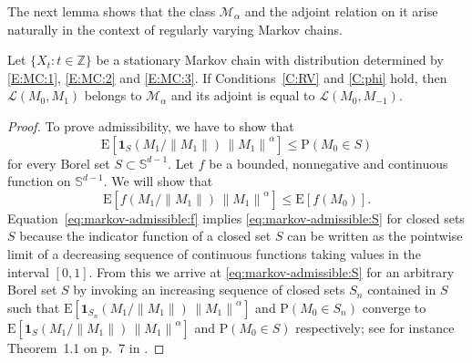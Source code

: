 \documentclass{aptpubarxiv}
\numberwithin{equation}{section}
\begin{document}
The next lemma shows that the class $\mathcal{M}_\alpha$ and the adjoint relation on it arise naturally in the context of regularly varying Markov chains.

\begin{lem}
\label{L:M1}
Let $\{ X_t : t \in {\mathbb{Z}}\}$ be a stationary Markov chain with distribution determined by \eqref{E:MC:1}, \eqref{E:MC:2} and \eqref{E:MC:3}. If Conditions~\ref{C:RV} and \ref{C:phi} hold, then ${\mathcal{L}}(M_0, M_1)$ belongs to $\mathcal{M}_\alpha$ and its adjoint is equal to ${\mathcal{L}}(M_0, M_{-1})$.
\end{lem}

\begin{proof}
To prove admissibility, we have to show that
\begin{equation}
\label{eq:markov-admissible:S}
  {\mathrm{E}}[ {\boldsymbol{1}}_S( M_1 / {\|{M_1}\|} ) \, {\|{M_1}\|}^\alpha ] \le {\mathrm{P}}( M_0 \in S )
\end{equation}
for every Borel set $S \subset \mathbb{S}^{d-1}$. Let $f$ be a bounded, nonnegative and continuous function on $\mathbb{S}^{d-1}$. We will show that
\begin{equation}
\label{eq:markov-admissible:f}
  {\mathrm{E}}[ f( M_1 / {\|{M_1}\|} ) \, {\|{M_1}\|}^\alpha ] \le {\mathrm{E}}[ f(M_0) ].
\end{equation}
Equation~\eqref{eq:markov-admissible:f} implies \eqref{eq:markov-admissible:S} for closed sets $S$ because the indicator function of a closed set $S$ can be written as the pointwise limit of a decreasing sequence of continuous functions taking values in the interval $[0, 1]$. From this we arrive at \eqref{eq:markov-admissible:S} for an arbitrary Borel set $S$ by invoking an increasing sequence of closed sets $S_n$ contained in $S$ such that ${\mathrm{E}}[ {\boldsymbol{1}}_{S_n}( M_1 / {\|{M_1}\|} ) \, {\|{M_1}\|}^\alpha ]$ and ${\mathrm{P}}( M_0 \in S_n )$ converge to ${\mathrm{E}}[ {\boldsymbol{1}}_S( M_1 / {\|{M_1}\|} ) \, {\|{M_1}\|}^\alpha ]$ and ${\mathrm{P}}( M_0 \in S )$ respectively; see for instance Theorem~1.1 on p.~7 in \citet{Bi68}.


\end{proof}
\end{document}
